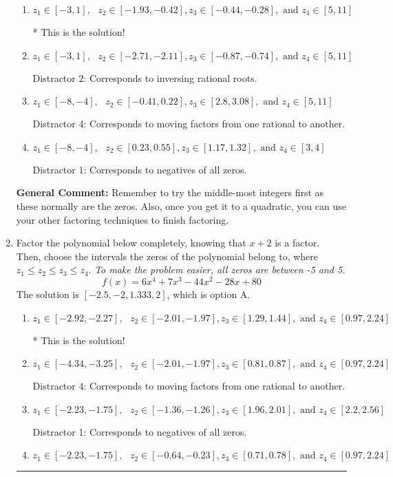 \documentclass{extbook}[14pt]
\newcommand{\litem}[1]{\item #1

\rule{\textwidth}{0.4pt}}
\begin{document}
\begin{enumerate}
{\begin{enumerate}[label=\Alph*.]
 Distractor 3: Corresponds to negatives of all zeros AND inversing rational roots.
\item \( z_1 \in [-3, 1], \text{   }  z_2 \in [-1.93, -0.42], z_3 \in [-0.44, -0.28], \text{   and   } z_4 \in [5, 11] \)

* This is the solution!
\item \( z_1 \in [-3, 1], \text{   }  z_2 \in [-2.71, -2.11], z_3 \in [-0.87, -0.74], \text{   and   } z_4 \in [5, 11] \)

 Distractor 2: Corresponds to inversing rational roots.
\item \( z_1 \in [-8, -4], \text{   }  z_2 \in [-0.41, 0.22], z_3 \in [2.8, 3.08], \text{   and   } z_4 \in [5, 11] \)

 Distractor 4: Corresponds to moving factors from one rational to another.
\item \( z_1 \in [-8, -4], \text{   }  z_2 \in [0.23, 0.55], z_3 \in [1.17, 1.32], \text{   and   } z_4 \in [3, 4] \)

 Distractor 1: Corresponds to negatives of all zeros.
\end{enumerate}

\textbf{General Comment:} Remember to try the middle-most integers first as these normally are the zeros. Also, once you get it to a quadratic, you can use your other factoring techniques to finish factoring.
}
\litem{
Factor the polynomial below completely, knowing that $x + 2$ is a factor. Then, choose the intervals the zeros of the polynomial belong to, where $z_1 \leq z_2 \leq z_3 \leq z_4$. \textit{To make the problem easier, all zeros are between -5 and 5.}
\[ f(x) = 6x^{4} +7 x^{3} -44 x^{2} -28 x + 80 \]The solution is \( [-2.5, -2, 1.333, 2] \), which is option A.\begin{enumerate}[label=\Alph*.]
\item \( z_1 \in [-2.92, -2.27], \text{   }  z_2 \in [-2.01, -1.97], z_3 \in [1.29, 1.44], \text{   and   } z_4 \in [0.97, 2.24] \)

* This is the solution!
\item \( z_1 \in [-4.34, -3.25], \text{   }  z_2 \in [-2.01, -1.97], z_3 \in [0.81, 0.87], \text{   and   } z_4 \in [0.97, 2.24] \)

 Distractor 4: Corresponds to moving factors from one rational to another.
\item \( z_1 \in [-2.23, -1.75], \text{   }  z_2 \in [-1.36, -1.26], z_3 \in [1.96, 2.01], \text{   and   } z_4 \in [2.2, 2.56] \)

 Distractor 1: Corresponds to negatives of all zeros.
\item \( z_1 \in [-2.23, -1.75], \text{   }  z_2 \in [-0.64, -0.23], z_3 \in [0.71, 0.78], \text{   and   } z_4 \in [0.97, 2.24] \)


\end{enumerate}}
\end{enumerate}
\end{document}
